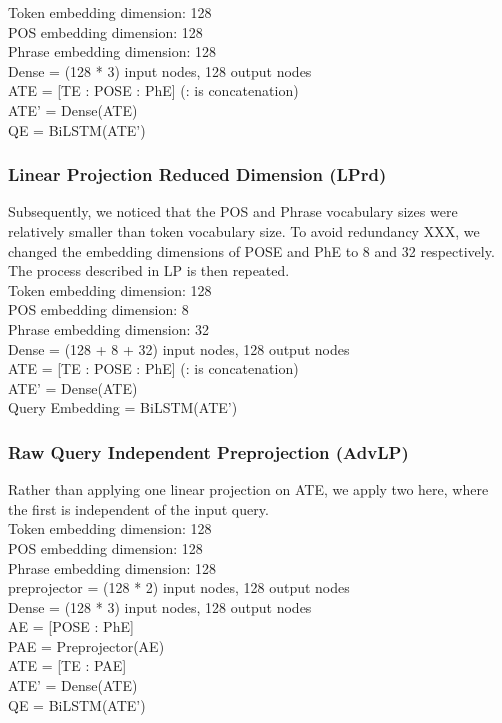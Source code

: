 \documentclass{IEEEtran}
\begin{document}
      \hspace*{-4mm}Token embedding dimension: 128 \\
      POS embedding dimension: 128 \\
      Phrase embedding dimension: 128 \\
      Dense = (128 * 3) input nodes, 128 output nodes \\ 
      ATE = [TE : POSE : PhE] (: is concatenation)\\
      ATE' = Dense(ATE) \\
      QE = BiLSTM(ATE') \\

      \subsubsection{Linear Projection Reduced Dimension (LPrd)} 
      Subsequently, we noticed that the POS and Phrase vocabulary sizes were relatively smaller
      than token vocabulary size. To avoid redundancy XXX, we changed the embedding dimensions
      of POSE and PhE to 8 and 32 respectively. The process described in LP is then repeated. \\

      \hspace*{-4mm}Token embedding dimension: 128 \\
      POS embedding dimension: 8 \\
      Phrase embedding dimension: 32 \\
      Dense = (128 + 8 + 32) input nodes, 128 output nodes \\
      ATE = [TE : POSE : PhE] (: is concatenation)\\
      ATE' = Dense(ATE) \\
      Query Embedding = BiLSTM(ATE') \\

      \subsubsection{Raw Query Independent Preprojection (AdvLP)}
      Rather than applying one linear projection on ATE, we apply two here, where the first is 
      independent of the input query. \\

      \hspace*{-4mm}Token embedding dimension: 128 \\
      POS embedding dimension: 128 \\
      Phrase embedding dimension: 128 \\
      preprojector = (128 * 2) input nodes, 128 output nodes \\
      Dense = (128 * 3) input nodes, 128 output nodes \\ 
      AE = [POSE : PhE] \\
      PAE = Preprojector(AE) \\
      ATE = [TE : PAE] \\
      ATE' = Dense(ATE) \\
      QE = BiLSTM(ATE') \\
\end{document}
